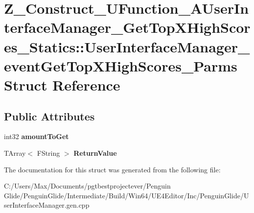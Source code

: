 \hypertarget{struct_z___construct___u_function___a_user_interface_manager___get_top_x_high_scores___statics_1304ac90e56efdd7702dabb87cd8072a7}{}\section{Z\+\_\+\+Construct\+\_\+\+U\+Function\+\_\+\+A\+User\+Interface\+Manager\+\_\+\+Get\+Top\+X\+High\+Scores\+\_\+\+Statics\+::User\+Interface\+Manager\+\_\+event\+Get\+Top\+X\+High\+Scores\+\_\+\+Parms Struct Reference}
\label{struct_z___construct___u_function___a_user_interface_manager___get_top_x_high_scores___statics_1304ac90e56efdd7702dabb87cd8072a7}
\subsection*{Public Attributes}
\begin{DoxyCompactItemize}
\item 
\mbox{\label{struct_z___construct___u_function___a_user_interface_manager___get_top_x_high_scores___statics_1304ac90e56efdd7702dabb87cd8072a7_afab434a69f5599193ea7c623f474b92c}} 
int32 {\bfseries amount\+To\+Get}
\item 
\mbox{\label{struct_z___construct___u_function___a_user_interface_manager___get_top_x_high_scores___statics_1304ac90e56efdd7702dabb87cd8072a7_a1130af7925cf36592499e959dd9ba0b4}} 
T\+Array$<$ F\+String $>$ {\bfseries Return\+Value}
\end{DoxyCompactItemize}


The documentation for this struct was generated from the following file\+:\begin{DoxyCompactItemize}
\item 
C\+:/\+Users/\+Max/\+Documents/pgtbestprojectever/\+Penguin Glide/\+Penguin\+Glide/\+Intermediate/\+Build/\+Win64/\+U\+E4\+Editor/\+Inc/\+Penguin\+Glide/User\+Interface\+Manager.\+gen.\+cpp\end{DoxyCompactItemize}
